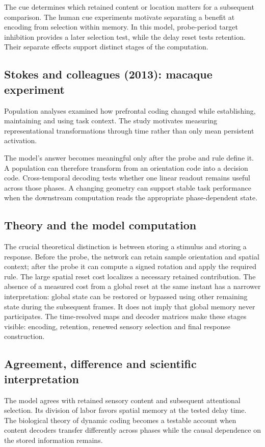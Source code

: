 \documentclass[11pt]{article}
\begin{document}
The cue determines which retained content or location matters for a subsequent comparison. The human cue experiments motivate separating a benefit at encoding from selection within memory. In this model, probe-period target inhibition provides a later selection test, while the delay reset tests retention. Their separate effects support distinct stages of the computation.

\subsection{Stokes and colleagues (2013): macaque experiment}
Population analyses examined how prefrontal coding changed while establishing, maintaining and using task context. The study motivates measuring representational transformations through time rather than only mean persistent activation. \cite{bio_stokes}

The model’s answer becomes meaningful only after the probe and rule define it. A population can therefore transform from an orientation code into a decision code. Cross-temporal decoding tests whether one linear readout remains useful across those phases. A changing geometry can support stable task performance when the downstream computation reads the appropriate phase-dependent state.

\subsection{Theory and the model computation}
The crucial theoretical distinction is between storing a stimulus and storing a response. Before the probe, the network can retain sample orientation and spatial context; after the probe it can compute a signed rotation and apply the required rule. The large spatial reset cost localizes a necessary retained contribution. The absence of a measured cost from a global reset at the same instant has a narrower interpretation: global state can be restored or bypassed using other remaining state during the subsequent frames. It does not imply that global memory never participates. The time-resolved maps and decoder matrices make these stages visible: encoding, retention, renewed sensory selection and final response construction.

\subsection{Agreement, difference and scientific interpretation}
The model agrees with retained sensory content and subsequent attentional selection. Its division of labor favors spatial memory at the tested delay time. The biological theory of dynamic coding becomes a testable account when content decoders transfer differently across phases while the causal dependence on the stored information remains.
\end{document}
